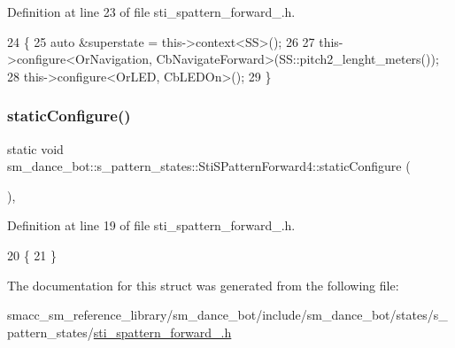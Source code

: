 Definition at line 23 of file sti\+\_\+spattern\+\_\+forward\+\_.\+h.


\begin{DoxyCode}
24   \{
25     \textcolor{keyword}{auto} &superstate = this->context<SS>();
26 
27     this->configure<OrNavigation, CbNavigateForward>(SS::pitch2\_lenght\_meters());
28     this->configure<OrLED, CbLEDOn>();
29   \}
\end{DoxyCode}
\mbox{\label{structsm__dance__bot_1_1s__pattern__states_1_1StiSPatternForward4_a387e35cd74525e1c124639f4452dbb6b}} 
\subsubsection{\texorpdfstring{static\+Configure()}{staticConfigure()}}
{\footnotesize\ttfamily static void sm\+\_\+dance\+\_\+bot\+::s\+\_\+pattern\+\_\+states\+::\+Sti\+S\+Pattern\+Forward4\+::static\+Configure (\begin{DoxyParamCaption}{ }\end{DoxyParamCaption})\hspace{0.3cm}{\ttfamily [inline]}, {\ttfamily [static]}}



Definition at line 19 of file sti\+\_\+spattern\+\_\+forward\+\_.\+h.


\begin{DoxyCode}
20   \{
21   \}
\end{DoxyCode}


The documentation for this struct was generated from the following file\+:\begin{DoxyCompactItemize}
\item 
smacc\+\_\+sm\+\_\+reference\+\_\+library/sm\+\_\+dance\+\_\+bot/include/sm\+\_\+dance\+\_\+bot/states/s\+\_\+pattern\+\_\+states/\hyperlink{include_2sm__dance__bot_2states_2s__pattern__states_2sti__spattern__forward__4_8h}{sti\+\_\+spattern\+\_\+forward\+\_.\+h}\end{DoxyCompactItemize}
